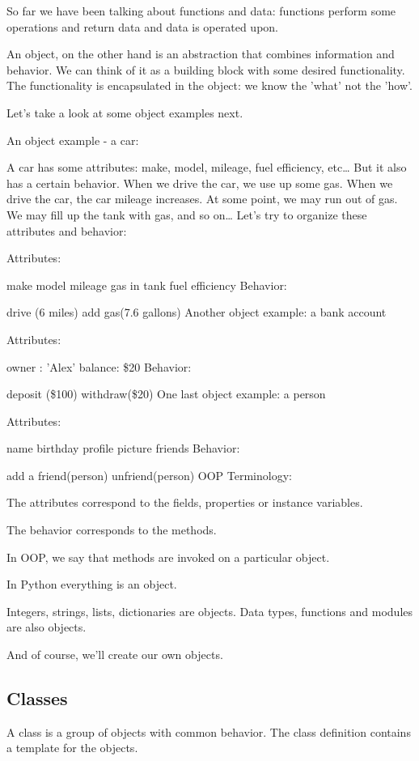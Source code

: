 \documentclass{article}
\begin{document}
So far we have been talking about functions and data:  functions perform some operations and return data and data is operated upon. 

An object, on the other hand is an abstraction that combines information and behavior.   We can think of it as a building block with some desired functionality.  The functionality is encapsulated in the object:  we know the 'what' not the 'how'.

Let's take a look at some object examples next.

An object example - a car:

A car has some attributes: make, model, mileage, fuel efficiency, etc…
But it also has a certain behavior.
When we drive the car, we use up some gas.
When we drive the car, the car mileage increases.
At some point, we may run out of gas.
We may fill up the tank with gas, and so on…
Let’s try to organize these attributes and behavior:

Attributes:

make
model
mileage
gas in tank
fuel efficiency
Behavior:

drive (6 miles) 
add gas(7.6 gallons)
Another object example: a bank account

Attributes:

owner : 'Alex' 
balance: {\$}20
Behavior:

deposit ({\$}100)
withdraw({\$}20)
One last object example: a person

Attributes:

name
birthday
profile picture
friends
Behavior:

 add a friend(person)
 unfriend(person)
OOP Terminology:

The attributes correspond to the fields, properties or instance variables.

The behavior corresponds to the methods.

In OOP, we say that methods are invoked on a particular object. 

In Python everything is an object. 

Integers, strings, lists, dictionaries are objects.  Data types, functions and modules are also objects.

And of course, we'll create our own objects.

\subsection{Classes}

A class is a group of objects with common behavior.  The class definition contains a template for the objects.
\end{document}

